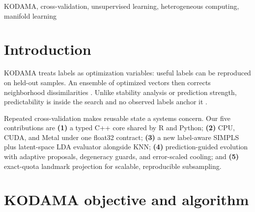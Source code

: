 \documentclass[twoside,11pt]{article}
\begin{document}
\begin{abstract}
KODAMA discovers latent structure by maximizing held-out label predictability. This standalone C++17 implementation is shared by thin R and Python wrappers. Native multicore CPU, NVIDIA CUDA, and Apple Metal backends provide float32 KNN without silent fallback and introduce a label-aware SIMPLS route followed by LDA in latent component space. The library also introduces prediction-guided label evolution and exact-quota landmark projection. In an explicitly exploratory matched CUDA analysis, PLS--LDA KODAMA improved UMAP truth-label silhouette on 6 of 10 datasets (median $+0.025$, bootstrap 95\% interval $[-0.067,+0.084]$); KNN and openTSNE were less favorable. We therefore separate systems validation from external-label diagnostics and make no universal visualization claim.
\end{abstract}

\begin{keywords}
KODAMA, cross-validation, unsupervised learning, heterogeneous computing, manifold learning
\end{keywords}

\section{Introduction}

KODAMA treats labels as optimization variables: useful labels can be reproduced on held-out samples. An ensemble of optimized vectors then corrects neighborhood dissimilarities \citep{cacciatore2014kodama,cacciatore2017kodama}. Unlike stability analysis or prediction strength, predictability is inside the search and no observed labels anchor it \citep{benhur2002stability,tibshirani2005predictionstrength}.

Repeated cross-validation makes reusable state a systems concern. Our five contributions are \textbf{(1)} a typed C++ core shared by R and Python; \textbf{(2)} CPU, CUDA, and Metal under one float32 contract; \textbf{(3)} a new label-aware SIMPLS plus latent-space LDA evaluator alongside KNN; \textbf{(4)} prediction-guided evolution with adaptive proposals, degeneracy guards, and error-scaled cooling; and \textbf{(5)} exact-quota landmark projection for scalable, reproducible subsampling.

\section{KODAMA objective and algorithm}
\end{document}
